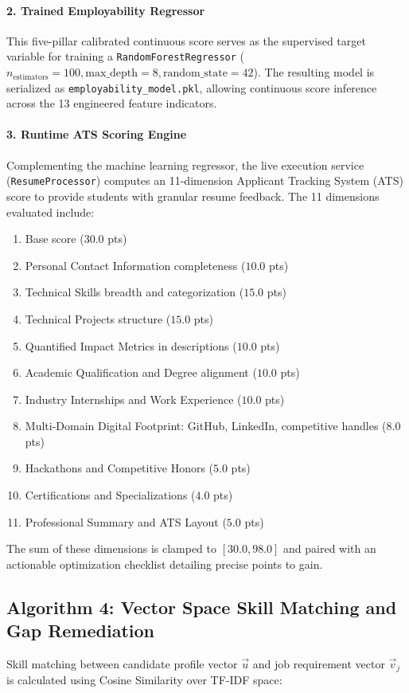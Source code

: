 \documentclass[12pt,a4paper]{report}
\begin{document}
\paragraph{2. Trained Employability Regressor}
This five-pillar calibrated continuous score serves as the supervised target variable for training a \texttt{RandomForestRegressor} ($n_{\text{estimators}}=100, \text{max\_depth}=8, \text{random\_state}=42$). The resulting model is serialized as \texttt{employability\_model.pkl}, allowing continuous score inference across the 13 engineered feature indicators.

\paragraph{3. Runtime ATS Scoring Engine}
Complementing the machine learning regressor, the live execution service (\texttt{ResumeProcessor}) computes an 11-dimension Applicant Tracking System (ATS) score to provide students with granular resume feedback. The 11 dimensions evaluated include:
\begin{enumerate}
    \item Base score ($30.0$ pts)
    \item Personal Contact Information completeness ($10.0$ pts)
    \item Technical Skills breadth and categorization ($15.0$ pts)
    \item Technical Projects structure ($15.0$ pts)
    \item Quantified Impact Metrics in descriptions ($10.0$ pts)
    \item Academic Qualification and Degree alignment ($10.0$ pts)
    \item Industry Internships and Work Experience ($10.0$ pts)
    \item Multi-Domain Digital Footprint: GitHub, LinkedIn, competitive handles ($8.0$ pts)
    \item Hackathons and Competitive Honors ($5.0$ pts)
    \item Certifications and Specializations ($4.0$ pts)
    \item Professional Summary and ATS Layout ($5.0$ pts)
\end{enumerate}
The sum of these dimensions is clamped to $[30.0, 98.0]$ and paired with an actionable optimization checklist detailing precise points to gain.

\subsection{Algorithm 4: Vector Space Skill Matching and Gap Remediation}
Skill matching between candidate profile vector $\vec{u}$ and job requirement vector $\vec{v}_j$ is calculated using Cosine Similarity over TF-IDF space:
\end{document}
